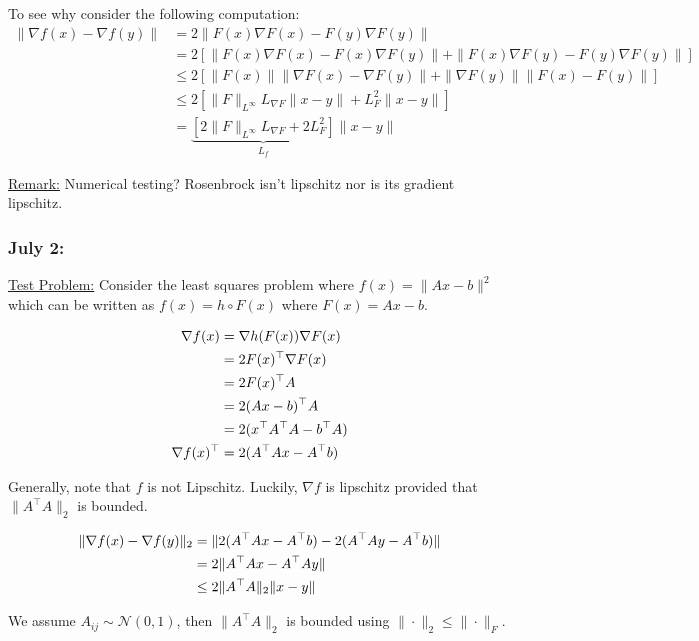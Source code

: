\documentclass{article}
\begin{document}
To see why consider the following computation:
\begin{align}
\| \nabla f(x) - \nabla f(y) \| & = 2\| F(x)\nabla F(x) - F(y) \nabla F(y) \| \\ & = 2 [\| F(x)\nabla F(x) -  F(x)\nabla F(y) \| + \| F(x)\nabla F(y) - F(y)\nabla F(y)\|] \\ & \leq 2[\|F(x)\| \| \nabla F(x) - \nabla F(y)\| + \| \nabla F(y)\| \| F(x) - F(y)\|] \\ & \leq 2[\|F\|_{L^{\infty}}L_{\nabla F}\|x-y\| + L_F^2\|x-y\| ] \\ & = \underbrace{[2\|F\|_{L^{\infty}}L_{\nabla F} + 2L_F^2]}_{L_{f}}\|x-y\|
\end{align}

\underline{Remark:} Numerical testing? Rosenbrock isn't lipschitz nor is its gradient lipschitz.  \newline 


\subsubsection{July 2:}

\underline{Test Problem:} Consider the least squares problem where $f(x) = \| Ax- b\|^2$ which can be written as $f(x) = h \circ F(x)$ where $F(x) = Ax - b$. \newline 

\begin{align}
\nabla f(x) & = \nabla h(F(x))\nabla F(x)\notag \\ & = 2F(x)^\top \nabla F(x) \notag \\ & = 2F(x)^\top A \notag \\ & = 2(Ax-b)^\top A \notag \\ & = 2(x^\top A^\top A - b^\top A) \\ \nabla f(x)^\top & = 2(A^\top Ax - A^\top b)
\end{align}

Generally, note that $f$ is not Lipschitz. Luckily, $\nabla f$ is lipschitz provided that $\|A^\top A\|_2$ is bounded. 

\begin{align}
\|\nabla f(x) - \nabla f(y)\|_2 & = \| 2(A^\top Ax - A^\top b) - 2(A^\top Ay - A^\top b)\| \notag \\ & = 2 \| A^\top Ax - A^\top Ay\| \notag \\ & \leq 2\|A^\top A\|_2 \|x-y\|
\end{align}

We assume $A_{ij} \sim \mathcal{N}(0,1)$, then $\|A^\top A\|_2$ is bounded using  $\| \cdot \|_2 \leq \| \cdot \|_F$. \newline 
\end{document}

